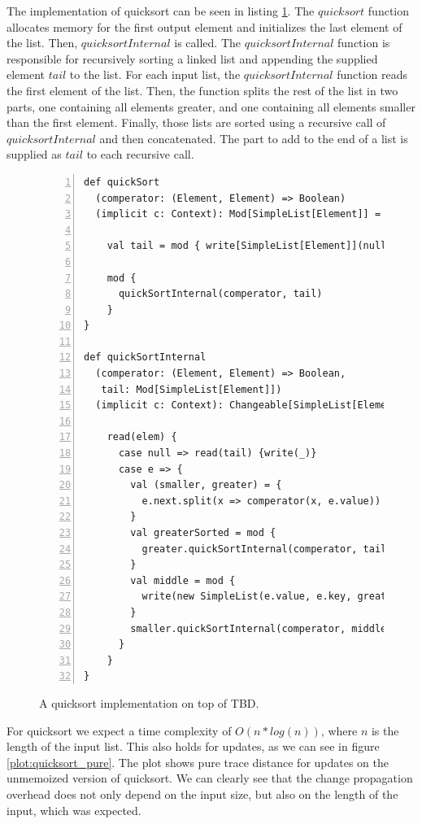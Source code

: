 The implementation of quicksort can be seen in listing \ref{code:quicksort}. The $quicksort$ function allocates memory for the first output element and initializes the last element of the list. Then, $quicksortInternal$ is called. The $quicksortInternal$ function is responsible for recursively sorting a linked list and appending the supplied element $tail$ to the list. For each input list, the $quicksortInternal$ function reads the first element of the list. Then, the function splits the rest of the list in two parts, one containing all elements greater, and one containing all elements smaller than the first element. Finally, those lists are sorted using a recursive call of $quicksortInternal$ and then concatenated. The part to add to the end of a list is supplied as $tail$ to each recursive call.

\begin{figure}
\begin{lstlisting}[frame=single,basicstyle=\ttfamily,numbers=left,mathescape=true]
def quickSort
  (comperator: (Element, Element) => Boolean)
  (implicit c: Context): Mod[SimpleList[Element]] = {

    val tail = mod { write[SimpleList[Element]](null) }

    mod {
      quickSortInternal(comperator, tail)
    }
}

def quickSortInternal
  (comperator: (Element, Element) => Boolean,
   tail: Mod[SimpleList[Element]])
  (implicit c: Context): Changeable[SimpleList[Element]] = {

    read(elem) {
      case null => read(tail) {write(_)}
      case e => {
        val (smaller, greater) = {
          e.next.split(x => comperator(x, e.value))
        }
        val greaterSorted = mod { 
          greater.quickSortInternal(comperator, tail) 
        }
        val middle = mod { 
          write(new SimpleList(e.value, e.key, greaterSorted)) 
        }
        smaller.quickSortInternal(comperator, middle)
      }
    }
}

\end{lstlisting}
\caption{A quicksort implementation on top of TBD.}
\label{code:quicksort}
\end{figure}

For quicksort we expect a time complexity of $O(n * log(n))$, where $n$ is the length of the input list. This also holds for updates, as we can see in figure \ref{plot:quicksort_pure}. The plot shows pure trace distance for updates on the unmemoized version of quicksort. We can clearly see that the change propagation overhead does not only depend on the input size, but also on the length of the input, which was expected. 

